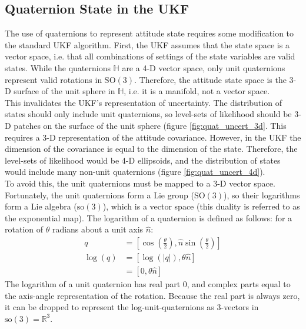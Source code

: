 \documentclass[conference]{IEEEtran}
\begin{document}
\subsection{Quaternion State in the UKF}
\label{sect:quat_ukf_problems}
The use of quaternions to represent attitude state requires some modification to the standard UKF algorithm. First, the UKF assumes
that the state space is a vector space, i.e. that all combinations of settings of the state variables are valid states. While the quaternions $\mathbb{H}$ are a 4-D vector space, only unit quaternions represent valid rotations in $\mathrm{SO(3)}$. Therefore, the attitude state space is the 3-D surface of the unit sphere in $\mathbb{H}$, i.e. it is a manifold, not a vector space.\\

This invalidates the UKF's representation of uncertainty. The distribution of states should only include unit quaternions, so level-sets of likelihood should be 3-D patches on the surface of the unit sphere (figure \ref{fig:quat_uncert_3d}. This requires a 3-D representation of the attitude covariance. However, in the UKF the dimension of the covariance is equal to the dimension of the state. Therefore, the level-sets of likelihood would be 4-D ellipsoids, and the distribution of states would include many non-unit quaternions (figure \ref{fig:quat_uncert_4d}).\\

To avoid this, the unit quaternions must be mapped to a 3-D vector space. Fortunately, the unit quaternions form a Lie group ($\mathrm{SO(3)}$), so their logarithms form a Lie algebra ($\mathrm{so(3)}$), which is a vector space (this duality is referred to as the exponential map). The logarithm of a quaternion is defined as follows: for a rotation of $\theta$ radians about a unit axis $\hat{n}$:
\begin{align}
    q &= [\cos(\frac{\theta}{2}), \hat{n} \sin(\frac{\theta}{2})] \\
    \log(q) &= [\log(|q|), \theta \hat{n}]\\
        &= [0, \theta \hat{n}]
\end{align}
The logarithm of a unit quaternion has real part 0, and complex parts equal to the axis-angle representation of the rotation. Because the real part is always zero, it can be dropped to represent the log-unit-quaternions as 3-vectors in $\mathrm{so(3)} = \mathbb{R}^3$.\\
\end{document}
